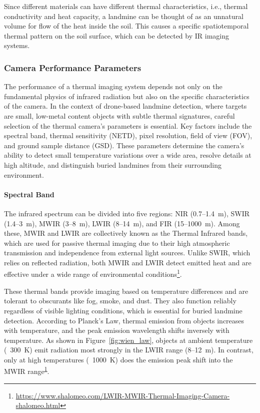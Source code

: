 Since different materials can have different thermal characteristics, i.e., thermal conductivity and heat capacity, a landmine can be thought of as an unnatural volume for flow of the heat inside the soil. This causes a specific spatiotemporal thermal pattern on the soil surface, which can be detected by IR imaging systems. 


\subsubsection{Camera Performance Parameters}

The performance of a thermal imaging system depends not only on the fundamental physics of infrared radiation but also on the specific characteristics of the camera. In the context of drone-based landmine detection, where targets are small, low-metal content objects with subtle thermal signatures, careful selection of the thermal camera's parameters is essential. Key factors include the spectral band, thermal sensitivity (NETD), pixel resolution, field of view (FOV), and ground sample distance (GSD). These parameters determine the camera’s ability to detect small temperature variations over a wide area, resolve details at high altitude, and distinguish buried landmines from their surrounding environment.


\paragraph{Spectral Band}
The infrared spectrum can be divided into five regions: NIR (0.7–1.4~\textmu m), SWIR (1.4–3~\textmu m), MWIR (3–8~\textmu m), LWIR (8–14~\textmu m), and FIR (15–1000~\textmu m). Among these, MWIR and LWIR are collectively known as the Thermal Infrared bands, which are used for passive thermal imaging due to their high atmospheric transmission and independence from external light sources. Unlike SWIR, which relies on reflected radiation, both MWIR and LWIR detect emitted heat and are effective under a wide range of environmental conditions\footnote{\label{LWIR}\url{https://www.shalomeo.com/LWIR-MWIR-Thermal-Imaging-Camera-shalomeo.html}}.

These thermal bands provide imaging based on temperature differences and are tolerant to obscurants like fog, smoke, and dust. They also function reliably regardless of visible lighting conditions, which is essential for buried landmine detection. According to Planck’s Law, thermal emission from objects increases with temperature, and the peak emission wavelength shifts inversely with temperature. As shown in Figure~\ref{fig:wien_law}, objects at ambient temperature (~300~K) emit radiation most strongly in the LWIR range (8–12~\textmu m). In contrast, only at high temperatures (~1000~K) does the emission peak shift into the MWIR range\textsuperscript{\ref{LWIR}}.

